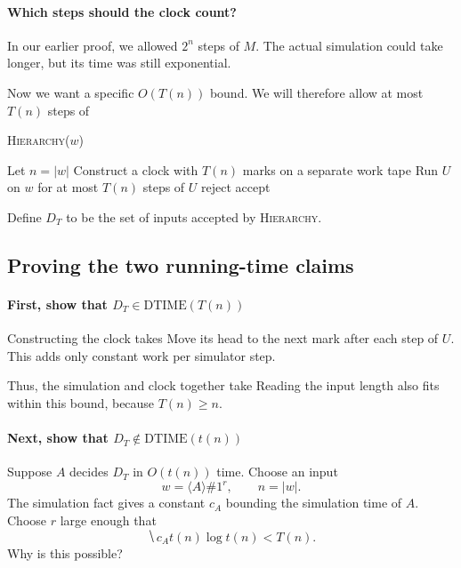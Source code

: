 \documentclass[11  pt]{article}
\begin{document}
\paragraph{Which steps should the clock count?}
In our earlier proof, we allowed $2^n$ steps of $M$. The actual simulation could take longer, but its time was still exponential.

Now we want a specific $O(T(n))$ bound. We will therefore allow at most $T(n)$ steps of 

\begin{algorithm}[h]
    \textsc{Hierarchy}($w$)
    \begin{algorithmic}
        \State Let $n=|w|$
        \State Construct a clock with $T(n)$ marks on a separate work tape
        \State Run $U$ on $w$ for at most $T(n)$ steps of $U$
            \State reject
        \Else
            \State accept
        \EndIf
    \end{algorithmic}
\end{algorithm}

Define $D_T$ to be the set of inputs accepted by \textsc{Hierarchy}.

\newpage
\subsection*{Proving the two running-time claims}
\paragraph{First, show that $D_T\in\mathrm{DTIME}(T(n))$}
Constructing the clock takes  Move its head to the next mark after each step of $U$. This adds only constant work per simulator step.

Thus, the simulation and clock together take  Reading the input length also fits within this bound, because $T(n)\geq n$.

\paragraph{Next, show that $D_T\notin\mathrm{DTIME}(t(n))$}
Suppose $A$ decides $D_T$ in $O(t(n))$ time. Choose an input
\begin{equation*}
    w=\langle A\rangle\#1^r,\qquad n=|w|.
\end{equation*}
The simulation fact gives a constant $c_A$ bounding the simulation time of $A$. Choose $r$ large enough that
\begin{equation*}
    \hide{c_A t(n)\log t(n)<T(n).}
\end{equation*}
Why is this possible?
\vs{1cm}
\end{document}
